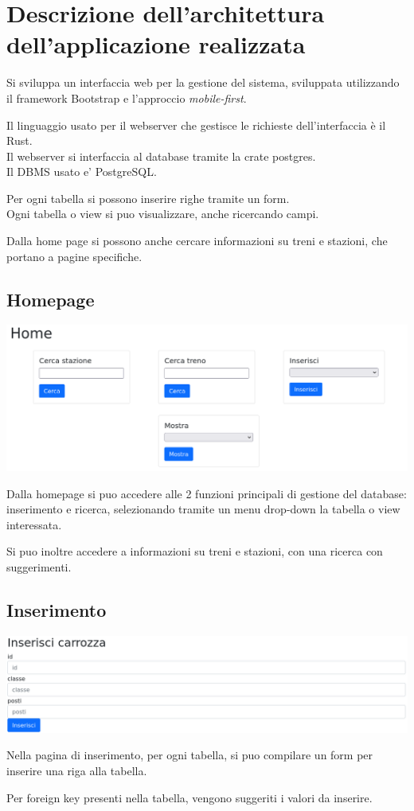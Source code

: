 \documentclass[a4paper,12pt]{report}
\begin{document}
	\section{Descrizione dell'architettura dell'applicazione realizzata}
	\par Si sviluppa un interfaccia web per la gestione del sistema, sviluppata utilizzando il framework Bootstrap e l'approccio \textit{mobile-first}.
	\par Il linguaggio usato per il webserver che gestisce le richieste dell'interfaccia è il Rust.
	\\Il webserver si interfaccia al database tramite la crate postgres.
	\\Il DBMS usato e' PostgreSQL.
	\par Per ogni tabella si possono inserire righe tramite un form.
	\\Ogni tabella o view si puo visualizzare, anche ricercando campi.
	\par Dalla home page si possono anche cercare informazioni su treni e stazioni, che portano a pagine specifiche.

	\subsection{Homepage}
	\includegraphics[width=\linewidth]{res/screenshots/home.png}
	\par Dalla homepage si puo accedere alle 2 funzioni principali di gestione del database: inserimento e ricerca,
	selezionando tramite un menu drop-down la tabella o view interessata.
	\par Si puo inoltre accedere a informazioni su treni e stazioni, con una ricerca con suggerimenti.
	\subsection{Inserimento}
	\includegraphics[width=\linewidth]{res/screenshots/inserisci.png}
	\par Nella pagina di inserimento, per ogni tabella, si puo compilare un form per inserire una riga alla tabella.
	\par Per foreign key presenti nella tabella, vengono suggeriti i valori da inserire.
\end{document}
